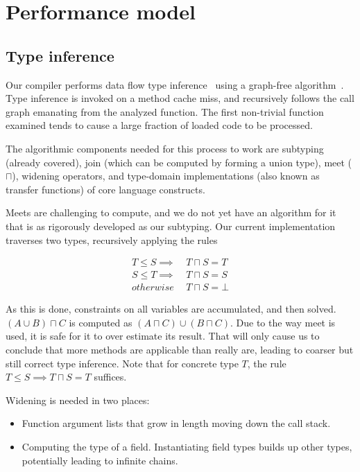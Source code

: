 \section{Performance model}

\subsection{Type inference}

Our compiler performs data flow type inference~\cite{kaplanullman,abstractinterp}
using a graph-free algorithm~\cite{graphfree}.
Type inference is invoked on a method cache miss, and recursively follows the
call graph emanating from the analyzed function.
The first non-trivial function examined tends to cause a large fraction of
loaded code to be processed.

The algorithmic components needed for this process to work are subtyping
(already covered), join (which can be computed by forming a union type),
meet ($\sqcap$), widening operators, and type-domain implementations
(also known as transfer functions) of core language constructs.

Meets are challenging to compute, and we do not yet have an algorithm for
it that is as rigorously developed as our subtyping.
Our current implementation traverses two types, recursively applying the
rules

\vspace{-3ex}
\begin{singlespace}
\begin{align*}
T\leq S  \implies &\ T\sqcap S = T \\
S\leq T  \implies &\ T\sqcap S = S \\
         otherwise\ &\ T\sqcap S = \bot
\end{align*}
\end{singlespace}

\noindent
As this is done, constraints on all variables are accumulated, and then
solved.
$(A\cup B)\sqcap C$ is computed as $(A\sqcap C) \cup (B\sqcap C)$.
Due to the way meet is used, it is safe for it to over estimate its
result.
That will only cause us to conclude that more methods are applicable
than really are, leading to coarser but still correct type inference.
Note that for concrete type $T$, the rule
$T\leq S \implies T\sqcap S = T$ suffices.

Widening is needed in two places:

\begin{itemize}
\item Function argument lists that grow in length moving down the call stack.
\item Computing the type of a field. Instantiating field types builds up
other types, potentially leading to infinite chains.
\end{itemize}

